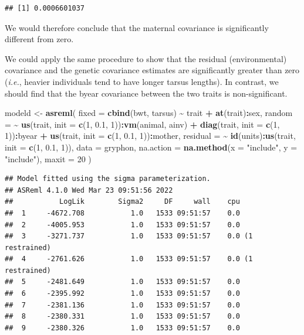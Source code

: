 \documentclass[
  12pt,
]{book}
\newenvironment{Shaded}{\begin{snugshade}}{\end{snugshade}}
\newcommand{\DataTypeTok}[1]{\textcolor[rgb]{0.13,0.29,0.53}{#1}}
\newcommand{\DecValTok}[1]{\textcolor[rgb]{0.00,0.00,0.81}{#1}}
\newcommand{\FloatTok}[1]{\textcolor[rgb]{0.00,0.00,0.81}{#1}}
\newcommand{\KeywordTok}[1]{\textcolor[rgb]{0.13,0.29,0.53}{\textbf{#1}}}
\newcommand{\NormalTok}[1]{#1}
\newcommand{\OperatorTok}[1]{\textcolor[rgb]{0.81,0.36,0.00}{\textbf{#1}}}
\newcommand{\StringTok}[1]{\textcolor[rgb]{0.31,0.60,0.02}{#1}}
\begin{document}
\begin{verbatim}
## [1] 0.0006601037
\end{verbatim}

We would therefore conclude that the maternal covariance is significantly different from zero.

We could apply the same procedure to show that the residual (environmental) covariance and the genetic covariance estimates are significantly greater than zero (\emph{i.e.}, heavier individuals tend to have longer tarsus lengths). In contrast, we should find that the byear covariance between the two traits is non-significant.

\begin{Shaded}
\begin{Highlighting}[]
\NormalTok{modeld \textless{}{-}}\StringTok{ }\KeywordTok{asreml}\NormalTok{(}
  \DataTypeTok{fixed =} \KeywordTok{cbind}\NormalTok{(bwt, tarsus) }\OperatorTok{\textasciitilde{}}\StringTok{ }\NormalTok{trait }\OperatorTok{+}\StringTok{ }\KeywordTok{at}\NormalTok{(trait)}\OperatorTok{:}\NormalTok{sex,}
  \DataTypeTok{random =} \OperatorTok{\textasciitilde{}}\StringTok{ }\KeywordTok{us}\NormalTok{(trait, }\DataTypeTok{init =} \KeywordTok{c}\NormalTok{(}\DecValTok{1}\NormalTok{, }\FloatTok{0.1}\NormalTok{, }\DecValTok{1}\NormalTok{))}\OperatorTok{:}\KeywordTok{vm}\NormalTok{(animal, ainv) }\OperatorTok{+}
\StringTok{    }\KeywordTok{diag}\NormalTok{(trait, }\DataTypeTok{init =} \KeywordTok{c}\NormalTok{(}\DecValTok{1}\NormalTok{, }\DecValTok{1}\NormalTok{))}\OperatorTok{:}\NormalTok{byear }\OperatorTok{+}
\StringTok{    }\KeywordTok{us}\NormalTok{(trait, }\DataTypeTok{init =} \KeywordTok{c}\NormalTok{(}\DecValTok{1}\NormalTok{, }\FloatTok{0.1}\NormalTok{, }\DecValTok{1}\NormalTok{))}\OperatorTok{:}\NormalTok{mother,}
  \DataTypeTok{residual =} \OperatorTok{\textasciitilde{}}\StringTok{ }\KeywordTok{id}\NormalTok{(units)}\OperatorTok{:}\KeywordTok{us}\NormalTok{(trait, }\DataTypeTok{init =} \KeywordTok{c}\NormalTok{(}\DecValTok{1}\NormalTok{, }\FloatTok{0.1}\NormalTok{, }\DecValTok{1}\NormalTok{)),}
  \DataTypeTok{data =}\NormalTok{ gryphon,}
  \DataTypeTok{na.action =} \KeywordTok{na.method}\NormalTok{(}\DataTypeTok{x =} \StringTok{"include"}\NormalTok{, }\DataTypeTok{y =} \StringTok{"include"}\NormalTok{),}
  \DataTypeTok{maxit =} \DecValTok{20}
\NormalTok{)}
\end{Highlighting}
\end{Shaded}

\begin{verbatim}
## Model fitted using the sigma parameterization.
## ASReml 4.1.0 Wed Mar 23 09:51:56 2022
##           LogLik        Sigma2     DF     wall    cpu
##  1     -4672.708           1.0   1533 09:51:57    0.0
##  2     -4005.953           1.0   1533 09:51:57    0.0
##  3     -3271.737           1.0   1533 09:51:57    0.0 (1 restrained)
##  4     -2761.626           1.0   1533 09:51:57    0.0 (1 restrained)
##  5     -2481.649           1.0   1533 09:51:57    0.0
##  6     -2395.992           1.0   1533 09:51:57    0.0
##  7     -2381.136           1.0   1533 09:51:57    0.0
##  8     -2380.331           1.0   1533 09:51:57    0.0
##  9     -2380.326           1.0   1533 09:51:57    0.0
\end{verbatim}
\end{document}
